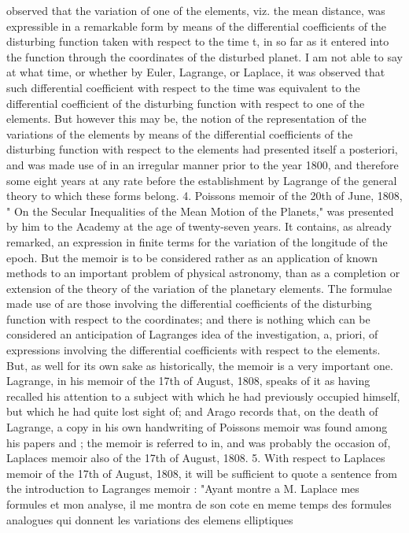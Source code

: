 \documentclass[11pt,a4paper]{book}
\begin{document}
observed that the variation of one of the elements, viz. the mean distance, was
expressible in a remarkable form by means of the differential coefficients of the
disturbing function taken with respect to the time t, in so far as it entered into the
function through the coordinates of the disturbed planet. I am not able to say at what
time, or whether by Euler, Lagrange, or Laplace, it was observed that such differential
coefficient with respect to the time was equivalent to the differential coefficient of the
disturbing function with respect to one of the elements. But however this may be,
the notion of the representation of the variations of the elements by means of the
differential coefficients of the disturbing function with respect to the elements had
presented itself a posteriori, and was made use of in an irregular manner prior to
the year 1800, and therefore some eight years at any rate before the establishment
by Lagrange of the general theory to which these forms belong.
4. Poissons memoir of the 20th of June, 1808, " On the Secular Inequalities of
the Mean Motion of the Planets," was presented by him to the Academy at the age
of twenty-seven years. It contains, as already remarked, an expression in finite terms
for the variation of the longitude of the epoch. But the memoir is to be considered
rather as an application of known methods to an important problem of physical
astronomy, than as a completion or extension of the theory of the variation of the
planetary elements. The formulae made use of are those involving the differential
coefficients of the disturbing function with respect to the coordinates; and there is
nothing which can be considered an anticipation of Lagranges idea of the investigation,
a, priori, of expressions involving the differential coefficients with respect to the
elements. But, as well for its own sake as historically, the memoir is a very important
one. Lagrange, in his memoir of the 17th of August, 1808, speaks of it as having
recalled his attention to a subject with which he had previously occupied himself, but
which he had quite lost sight of; and Arago records that, on the death of Lagrange,
a copy in his own handwriting of Poissons memoir was found among his papers and
;
the memoir is referred to in, and was probably the occasion of, Laplaces memoir also
of the 17th of August, 1808.
5. With respect to Laplaces memoir of the 17th of August, 1808, it will be
sufficient to quote a sentence from the introduction to Lagranges memoir : "Ayant
montre a M. Laplace mes formules et mon analyse, il me montra de son cote en
meme temps des formules analogues qui donnent les variations des elemens elliptiques
\end{document}
